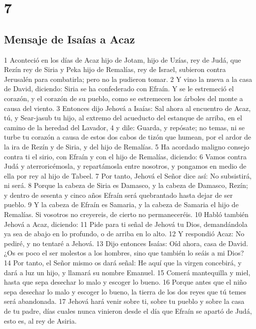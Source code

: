 \chapter{7}

\section*{Mensaje de Isaías a Acaz}

1 Aconteció en los días de Acaz hijo de Jotam, hijo de Uzías, rey de Judá, que Rezín rey de Siria y Peka hijo de Remalías, rey de Israel, subieron contra Jerusalén para combatirla; pero no la pudieron tomar. 
2 Y vino la nueva a la casa de David, diciendo: Siria se ha confederado con Efraín. Y se le estremeció el corazón, y el corazón de su pueblo, como se estremecen los árboles del monte a causa del viento.
3 Entonces dijo Jehová a Isaías: Sal ahora al encuentro de Acaz, tú, y Sear-jasub tu hijo, al extremo del acueducto del estanque de arriba, en el camino de la heredad del Lavador,
4 y dile: Guarda, y repósate; no temas, ni se turbe tu corazón a causa de estos dos cabos de tizón que humean, por el ardor de la ira de Rezín y de Siria, y del hijo de Remalías.
5 Ha acordado maligno consejo contra ti el sirio, con Efraín y con el hijo de Remalías, diciendo:
6 Vamos contra Judá y aterroricémosla, y repartámosla entre nosotros, y pongamos en medio de ella por rey al hijo de Tabeel.
7 Por tanto, Jehová el Señor dice así: No subsistirá, ni será.
8 Porque la cabeza de Siria es Damasco, y la cabeza de Damasco, Rezín; y dentro de sesenta y cinco años Efraín será quebrantado hasta dejar de ser pueblo.
9 Y la cabeza de Efraín es Samaria, y la cabeza de Samaria el hijo de Remalías. Si vosotros no creyereis, de cierto no permaneceréis.
10 Habló también Jehová a Acaz, diciendo:
11 Pide para ti señal de Jehová tu Dios, demandándola ya sea de abajo en lo profundo, o de arriba en lo alto.
12 Y respondió Acaz: No pediré, y no tentaré a Jehová.
13 Dijo entonces Isaías: Oíd ahora, casa de David. ¿Os es poco el ser molestos a los hombres, sino que también lo seáis a mi Dios?
14 Por tanto, el Señor mismo os dará señal: He aquí que la virgen concebirá, y dará a luz un hijo, y llamará su nombre Emanuel.
15 Comerá mantequilla y miel, hasta que sepa desechar lo malo y escoger lo bueno.
16 Porque antes que el niño sepa desechar lo malo y escoger lo bueno, la tierra de los dos reyes que tú temes será abandonada.
17 Jehová hará venir sobre ti, sobre tu pueblo y sobre la casa de tu padre, días cuales nunca vinieron desde el día que Efraín se apartó de Judá, esto es, al rey de Asiria.
